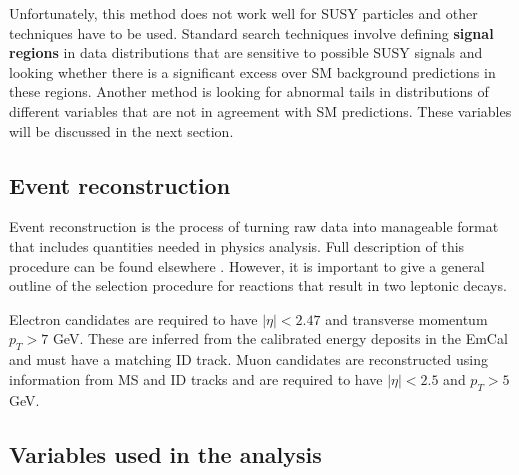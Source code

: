 Unfortunately, this method does not work well for SUSY particles and other techniques have to be used. Standard search techniques involve defining \textbf{signal regions} in data distributions that are sensitive to possible SUSY signals and looking whether there is a significant excess over SM background predictions in these regions. Another method is looking for abnormal tails in distributions of different variables that are not in agreement with SM predictions. These variables will be discussed in the next section.

\subsection{Event reconstruction}

Event reconstruction is the process of turning raw data into manageable format that includes quantities needed in physics analysis. Full description of this procedure can be found elsewhere \citep{atlas2015search}. However, it is important to give a general outline of the selection procedure for reactions that result in two leptonic decays.

Electron candidates are required to have $|\eta|<2.47$ and transverse momentum $p_{T}>7$ GeV. These are inferred from the calibrated  energy deposits in the EmCal and must have a matching ID track. Muon candidates are reconstructed using information from MS and ID tracks and are required to have   $|\eta|<2.5$ and $p_{T}>5$ GeV. 


\subsection{Variables used in the analysis}





 
